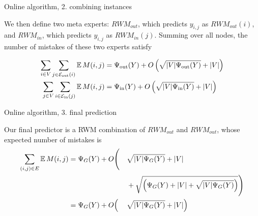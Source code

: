 \documentclass[10pt,svgnames,ignorenonframetext,final]{beamer}
\begin{document}
\begin{frame}{Online algorithm, 2. combining instances}

We then define two meta experts: \(RWM_{out}\), which predicts
\(y_{i,j}\) as \(RWM_{out}(i)\), and \(RWM_{in}\), which predicts
\(y_{i,j}\) as \(RWM_{in}(j)\). Summing over all nodes, the number of
mistakes of these two experts satisfy

\begin{align*}
    \sum_{i \in V}\sum_{j \in \mathcal{E}_{\mathrm{out}}(i)} \mathbb{E}\,M(i,j) &= \Psi_{\mathrm{out}}(Y) + O\left(\sqrt{|V|\Psi_{\mathrm{out}}(Y)} + |V|\right) \\
    \sum_{j \in V}\sum_{i \in \mathcal{E}_{\mathrm{in}}(j)} \mathbb{E}\,M(i,j)  &= \Psi_{\mathrm{in}}(Y)  + O\left(\sqrt{|V|\Psi_{\mathrm{in}}(Y)}  + |V|\right)
\end{align*}
\end{frame}

\begin{frame}{Online algorithm, 3. final prediction}

Our final predictor is a RWM combination of \(RWM_{out}\) and
\(RWM_{out}\), whose expected number of mistakes is
\begin{alignat*}{3}
    \sum_{(i,j) \in E} \mathbb{E}\,M(i,j) 
    &= \Psi_G(Y) + O\Biggl(&&\sqrt{|V|\Psi_G(Y)} + |V| \\
  & &&+ \sqrt{\Bigl(\Psi_G(Y) + |V| + \sqrt{|V|\Psi_G(Y)}\Bigr)} \Biggr)\\
    &= \Psi_G(Y) + O\Bigl( &&\sqrt{|V|\Psi_G(Y)} + |V|\Bigr)
\end{alignat*}

\end{frame}
\end{document}
